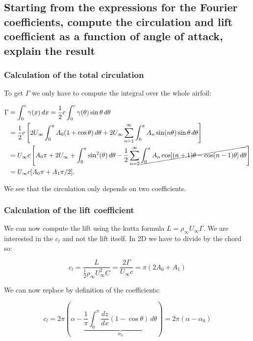 \documentclass[british,french,11pt, a4paper, openany]{article}
\begin{document}
\subsection{Starting from the expressions for the Fourier coefficients, compute the	circulation and lift coefficient as a function of angle of attack, explain the result}

\subsubsection{Calculation of the total circulation}

To get $\Gamma$ we only have to compute the integral over the whole airfoil:

\begin{equation}
\begin{aligned}
\Gamma &= \int _0 ^c \gamma (x) \, dx = \frac{1}{2} c \int _0 ^c \gamma (\theta ) \sin \theta \, d\theta \\
& = \frac{1}{2} c \left[ 2U_\infty \int _0 ^\pi A_0 (1+\cos\theta) \, d\theta + 2U_\infty \sum _{n=1}^\infty \int _0^\pi A_n \sin (n\theta)\sin \theta \, d\theta  \right] \\
&= U_\infty  c \left[  A_0 \pi  + 2U_\infty + \int _0^\pi \sin ^2(\theta) \, d\theta - \frac{1}{2} \sum _{n=2}^\infty \cancel{\int _0^\pi A_n \cos [(n+1)\theta - \cos (n-1)\theta ] \, d\theta } \right] \\
&= U_\infty c [A_0 \pi + A_1 \pi /2].
\end{aligned}
\end{equation}

We see that the circulation only depends on two coefficients. 

\subsubsection{Calculation of the lift coefficient}
We can now compute the lift using the kutta formula $L = \rho _\infty U_\infty \Gamma$. We are interested in the $c_l$ and not the lift itself. In 2D we have to divide by the chord so: 

\begin{equation}
c_l = \frac{L}{\frac{1}{2} \rho _\infty U_\infty ^2 C} = \frac{2\Gamma}{U_\infty c} = \pi (2A_0 + A_1)
\label{eq:2.70}
\end{equation}

We can now replace by definition of the coefficients: 

\begin{equation}
c_l = 2\pi\left(\alpha - \underbrace{\frac{1}{\pi} \int _0^\pi \frac{dz}{dx} (1-\cos \theta)\, d\theta}_{\alpha _0} \right) = 2\pi (\alpha - \alpha _0)
\label{eq:2.71}
\end{equation}
\end{document}
